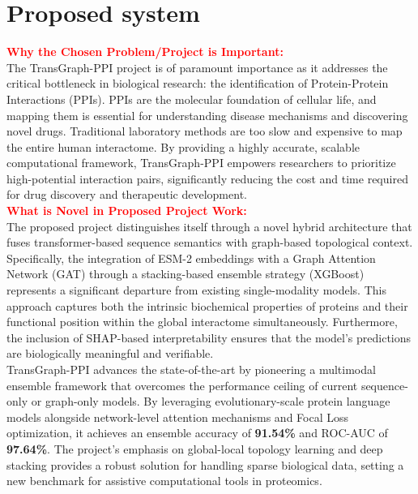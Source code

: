 \documentclass[12pt,a4paper]{report}
\begin{document}
\section{Proposed system}

\noindent
\textbf{\textcolor{red}{Why the Chosen Problem/Project is Important:}} \\
The TransGraph-PPI project is of paramount importance as it addresses the critical bottleneck in biological research: the identification of Protein-Protein Interactions (PPIs). PPIs are the molecular foundation of cellular life, and mapping them is essential for understanding disease mechanisms and discovering novel drugs. Traditional laboratory methods are too slow and expensive to map the entire human interactome. By providing a highly accurate, scalable computational framework, TransGraph-PPI empowers researchers to prioritize high-potential interaction pairs, significantly reducing the cost and time required for drug discovery and therapeutic development. \\

\noindent
\textbf{\textcolor{red}{What is Novel in Proposed Project Work:}} \\
The proposed project distinguishes itself through a novel hybrid architecture that fuses transformer-based sequence semantics with graph-based topological context. Specifically, the integration of ESM-2 embeddings with a Graph Attention Network (GAT) through a stacking-based ensemble strategy (XGBoost) represents a significant departure from existing single-modality models. This approach captures both the intrinsic biochemical properties of proteins and their functional position within the global interactome simultaneously. Furthermore, the inclusion of SHAP-based interpretability ensures that the model's predictions are biologically meaningful and verifiable. \\

\noindent
TransGraph-PPI advances the state-of-the-art by pioneering a multimodal ensemble framework that overcomes the performance ceiling of current sequence-only or graph-only models. By leveraging evolutionary-scale protein language models alongside network-level attention mechanisms and Focal Loss optimization, it achieves an ensemble accuracy of \textbf{91.54\%} and ROC-AUC of \textbf{97.64\%}. The project's emphasis on global-local topology learning and deep stacking provides a robust solution for handling sparse biological data, setting a new benchmark for assistive computational tools in proteomics. \\
\end{document}

